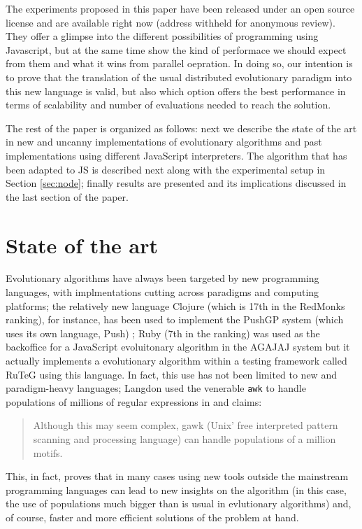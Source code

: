 \documentclass{sig-alternate}
\begin{document}
The experiments proposed in this paper have been released under an
open source license and are available right now (address withheld for
anonymous review). They offer a glimpse into the different
possibilities of programming using Javascript, but at the same time
show the kind of performace we should expect from them and what it
wins from parallel oepration. In doing so, our intention is to prove
that the translation of the usual distributed evolutionary paradigm
into this new language is valid, but also which option offers the best
performance in terms of scalability and number of evaluations needed
to reach the solution.

The rest of the paper is organized as follows: next we describe the
state of the art in new and uncanny implementations of evolutionary algorithms and
past implementations using different JavaScript interpreters. The
algorithm that has been adapted to JS is described next along with the
experimental setup in Section \ref{sec:node}; finally results are presented and its implications
discussed in the last section of the paper. 

\section{State of the art}
\label{sec:soa}

Evolutionary algorithms have always been targeted by new programming
languages, with implmentations cutting across paradigms and computing
platforms; the relatively new language Clojure (which is 17th in the
RedMonks ranking), for instance, has been used to implement the PushGP
system (which uses its own language, Push) \cite{helmuth2013evolving};
Ruby (7th in the ranking) was used as the backoffice for a JavaScript
evoluitonary algorithm in the AGAJAJ system \cite{agajaj} but it
actually implements a evolutionary algorithm within a testing
framework called RuTeG \cite{mairhofer2011search} using this
language. In fact, this use has not been limited to new and
paradigm-heavy languages; Langdon used the venerable {\tt awk} to
handle populations of millions of regular expressions in
\cite{langdon2008evolving,langdon2009evolving} and claims:
\begin{quote}
Although this may seem complex, gawk (Unix' free interpreted pattern
scanning and processing language) can handle populations of a million
motifs. 
\end{quote}
This, in fact, proves that in many cases using new tools outside the
mainstream programming languages can lead to new insights on the
algorithm (in this case, the use of populations much bigger than is
usual in evlutionary algorithms) and, of course, faster and more
efficient solutions of the problem at hand. 
\end{document}
